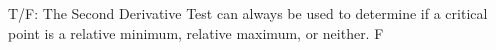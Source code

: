 {T/F: The Second Derivative Test can always be used to determine if a critical point is a relative minimum, relative maximum, or neither.
}
{F
}
